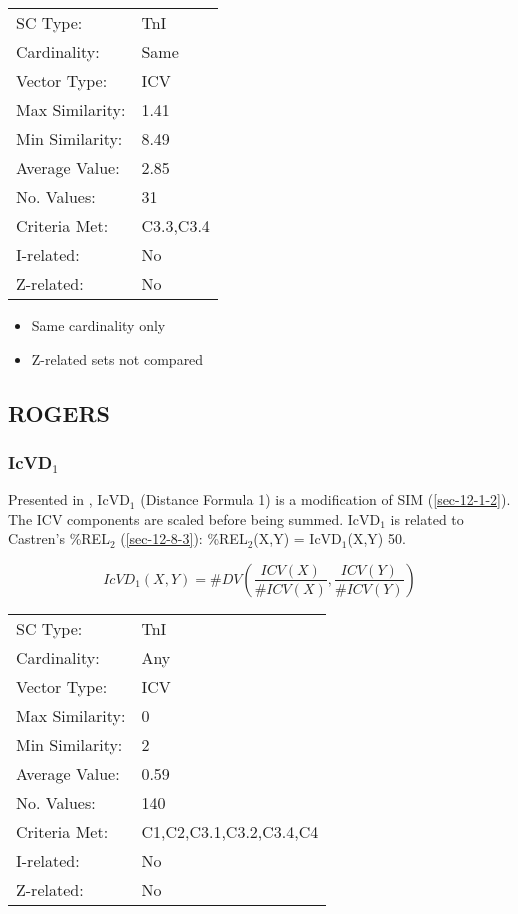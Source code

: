 \documentclass{article}
\begin{document}
\begin{center}
\begin{tabular}{ll}
 SC Type:         &  TnI        \\
 Cardinality:     &  Same       \\
 Vector Type:     &  ICV        \\
 Max Similarity:  &  1.41       \\
 Min Similarity:  &  8.49       \\
 Average Value:   &  2.85       \\
 No. Values:      &  31         \\
 Criteria Met:    &  C3.3,C3.4  \\
 I-related:       &  No         \\
 Z-related:       &  No         \\
\end{tabular}
\end{center}


\begin{itemize}
\item Same cardinality only
\item Z-related sets not compared
\end{itemize}
\subsection{ROGERS}
\label{sec-12-4}
\subsubsection{IcVD$_{1}$}
\label{sec-12-4-1}

Presented in \citet{Rogers1992}, IcVD$_{1}$ (Distance Formula 1) is a
modification of SIM (\ref{sec-12-1-2}). The ICV components are scaled before being
summed. IcVD$_{1}$ is related to Castren's \%REL$_{2}$ (\ref{sec-12-8-3}):
\%REL$_{2}$(X,Y) = IcVD$_{1}$(X,Y)\texttimes{} 50.  

$$IcVD_{1}(X,Y)=\#DV\left(\frac{ICV(X)}{\#ICV(X)},\frac{ICV(Y)}{\#ICV(Y)}\right)$$


\begin{center}
\begin{tabular}{ll}
 SC Type:         &  TnI                      \\
 Cardinality:     &  Any                      \\
 Vector Type:     &  ICV                      \\
 Max Similarity:  &  0                        \\
 Min Similarity:  &  2                        \\
 Average Value:   &  0.59                     \\
 No. Values:      &  140                      \\
 Criteria Met:    &  C1,C2,C3.1,C3.2,C3.4,C4  \\
 I-related:       &  No                       \\
 Z-related:       &  No                       \\
\end{tabular}
\end{center}
\end{document}
